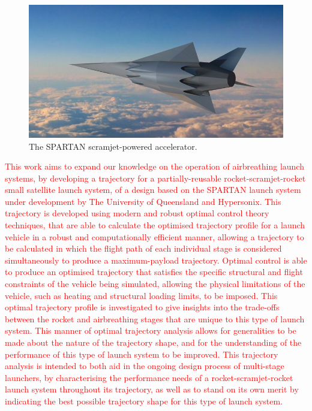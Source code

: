   	     	  	\begin{figure}[ht]
  	     	  		\centering
  	     	  		\includegraphics[width=0.7\linewidth]{figures/1_introduction/project-spartan}
  	     	  		\caption{The SPARTAN scramjet-powered accelerator\cite{BBC}.}
  	     	  		\label{fig:project-spartan}
  	     	  	\end{figure}
  	   \textcolor{red}{
  	   This work aims to expand our knowledge on the operation of airbreathing launch systems, by developing a trajectory for a partially-reusable rocket-scramjet-rocket small satellite launch system, of a design based on the SPARTAN launch system under development by The University of Queensland and Hypersonix\cite{Preller2017b}.
  	   This trajectory is developed using modern and robust optimal control theory techniques, that are able to calculate the optimised trajectory profile for a launch vehicle in a robust and computationally efficient manner, allowing a trajectory to be calculated in which the flight path of each individual stage is considered simultaneously to produce a maximum-payload trajectory\cite{Betts1998}. 
  	   Optimal control is able to produce an optimised trajectory that satisfies the specific structural and flight constraints of the vehicle being simulated, allowing the physical limitations of the vehicle, such as heating and structural loading limits, to be imposed\cite{Betts1998}.
  	   This optimal trajectory profile is investigated to give insights into the trade-offs between the rocket and airbreathing stages that are unique to this type of launch system. This manner of optimal trajectory analysis allows for generalities to be made about the nature of the trajectory shape, and for the understanding of the performance of this type of launch system to be improved.
  	   This trajectory analysis is intended to both aid in the ongoing design process of multi-stage launchers, by characterising the performance needs of a rocket-scramjet-rocket launch system throughout its trajectory, as well as to stand on its own merit by indicating the best possible trajectory shape for this type of launch system. 
  	}
  	   
